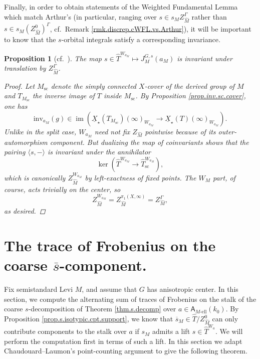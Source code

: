 \documentclass[openany]{amsbook}
\newtheorem{proposition}[theorem]{Proposition}
\theoremstyle{definition}
\theoremstyle{remark}
\numberwithin{equation}{section}
\newcommand{\im}{\operatorname{im}}
\newcommand{\ol}[1]{\overline{#1}}
\newcommand{\ul}[1]{\underline{#1}}
\renewcommand{\-}{\operatorname{-}}
\newcommand{\el}{\text{-ell}}
\newcommand{\bA}{\mathsf{A}}
\newcommand{\bAe}[1]{\bA_{#1\el}}
\newcommand{\inv}{\mathrm{inv}}
\renewcommand{\sc}{\mathrm{sc}}
\begin{document}
Finally, in order to obtain statements of the Weighted Fundamental Lemma which match Arthur's (in particular, ranging over $s \in s_M Z_{\widehat{M}}^\Gamma$ rather than $s \in s_M (Z_{\widehat{M}}^0)^\Gamma$, cf.\ Remark \ref{rmk.discrep.cWFL.vs.Arthur}), it will be important to know that the $s$-orbital integrals satisfy a corresponding invariance. 

\begin{proposition}[{cf.\ \cite[Proposition 11.7.3]{CLII}}]\label{prop.s.orbital.int.invariant.under.center}
    The map $s \in \widehat{T}^{W_{a_M}} \mapsto J_M^{G,s}(a_M)$ is invariant under translation by $Z_{\widehat{M}}^\Gamma$.
    \begin{proof}
        Let $M_{\sc}$ denote the simply connected $X$-cover of the derived group of $M$ and $T_{M_{\sc}}$ the inverse image of $T$ inside $M_{\sc}$. By Proposition \ref{prop.inv.sc.cover}, one has $$\inv_{a_M}(g) \in \im\left(\ul{X}_\star(T_{M_{\sc}})(\infty)_{W_{a_M}} \to  \ul{X}_\star(T)(\infty)_{W_{a_M}}\right).$$ Unlike in the split case, $W_{a_M}$ need not fix $Z_{\widehat{M}}$ pointwise because of its outer-automorphism component. But dualizing the map of coinvariants shows that the pairing $\langle s, - \rangle$ is invariant under the annihilator 
        $$\ker\left(\widehat{T}^{W_{a_M}} \to \widehat{T}_{\sc}^{W_{a_M}}\right),$$
        which is canonically $Z_{\widehat{M}}^{W_{a_M}}$ by left-exactness of fixed points. The $W_M$ part, of course, acts trivially on the center, so $$Z_{\widehat{M}}^{W_{a_M}} = Z_{\widehat{M}}^{\pi_1(X,\infty)} = Z_{\widehat{M}}^\Gamma,$$ as desired.
    \end{proof}
\end{proposition}









\section{The trace of Frobenius on the coarse $\ol{s}$-component.}

Fix semistandard Levi $M$, and assume that $G$ has anisotropic center. In this section, we compute the alternating sum of traces of Frobenius on the stalk of the coarse $s$-decomposition of Theorem \ref{thm.s.decomp} over $a \in \bAe{M}(k_0)$. By Proposition \ref{prop.s.isotypic.cpt.support}, we know that $\ol{s}_M \in \widehat{T}/Z_{\widehat{M}}^0$ can only contribute components to the stalk over $a$ if $s_M$ admits a lift $s \in \widehat{T}^{W_a}$. We will perform the computation first in terms of such a lift. In this section we adapt Chaudouard--Laumon's point-counting argument to give the following theorem.
\end{document}
